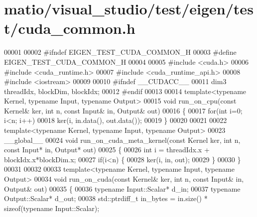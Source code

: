 \hypertarget{matio_2visual__studio_2test_2eigen_2test_2cuda__common_8h_source}{}\section{matio/visual\+\_\+studio/test/eigen/test/cuda\+\_\+common.h}
\label{matio_2visual__studio_2test_2eigen_2test_2cuda__common_8h_source}

\begin{DoxyCode}
00001 
00002 \textcolor{preprocessor}{#ifndef EIGEN\_TEST\_CUDA\_COMMON\_H}
00003 \textcolor{preprocessor}{#define EIGEN\_TEST\_CUDA\_COMMON\_H}
00004 
00005 \textcolor{preprocessor}{#include <cuda.h>}
00006 \textcolor{preprocessor}{#include <cuda\_runtime.h>}
00007 \textcolor{preprocessor}{#include <cuda\_runtime\_api.h>}
00008 \textcolor{preprocessor}{#include <iostream>}
00009 
00010 \textcolor{preprocessor}{#ifndef \_\_CUDACC\_\_}
00011 dim3 threadIdx, blockDim, blockIdx;
00012 \textcolor{preprocessor}{#endif}
00013 
00014 \textcolor{keyword}{template}<\textcolor{keyword}{typename} Kernel, \textcolor{keyword}{typename} Input, \textcolor{keyword}{typename} Output>
00015 \textcolor{keywordtype}{void} run\_on\_cpu(\textcolor{keyword}{const} Kernel& ker, \textcolor{keywordtype}{int} n, \textcolor{keyword}{const} Input& in, Output& out)
00016 \{
00017   \textcolor{keywordflow}{for}(\textcolor{keywordtype}{int} i=0; i<n; i++)
00018     ker(i, in.data(), out.data());
00019 \}
00020 
00021 
00022 \textcolor{keyword}{template}<\textcolor{keyword}{typename} Kernel, \textcolor{keyword}{typename} Input, \textcolor{keyword}{typename} Output>
00023 \_\_global\_\_
00024 \textcolor{keywordtype}{void} run\_on\_cuda\_meta\_kernel(\textcolor{keyword}{const} Kernel ker, \textcolor{keywordtype}{int} n, \textcolor{keyword}{const} Input* in, Output* out)
00025 \{
00026   \textcolor{keywordtype}{int} i = threadIdx.x + blockIdx.x*blockDim.x;
00027   \textcolor{keywordflow}{if}(i<n) \{
00028     ker(i, in, out);
00029   \}
00030 \}
00031 
00032 
00033 \textcolor{keyword}{template}<\textcolor{keyword}{typename} Kernel, \textcolor{keyword}{typename} Input, \textcolor{keyword}{typename} Output>
00034 \textcolor{keywordtype}{void} run\_on\_cuda(\textcolor{keyword}{const} Kernel& ker, \textcolor{keywordtype}{int} n, \textcolor{keyword}{const} Input& in, Output& out)
00035 \{
00036   \textcolor{keyword}{typename} Input::Scalar*  d\_in;
00037   \textcolor{keyword}{typename} Output::Scalar* d\_out;
00038   std::ptrdiff\_t in\_bytes  = in.size()  * \textcolor{keyword}{sizeof}(\textcolor{keyword}{typename} Input::Scalar);

\end{DoxyCode}
